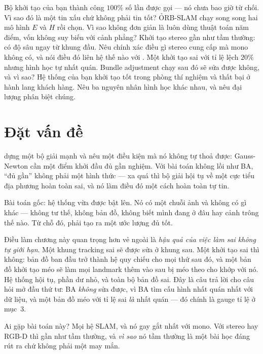 \documentclass[../../vslam.tex]{subfiles}
\begin{document}
\begin{khoigoi}
\h{Bộ khởi tạo của bạn thành công \(100\%\) số lần được gọi --- nó chưa bao giờ từ chối. Vì sao đó là một tin xấu chứ không phải tin tốt?}
\h{ORB-SLAM chạy song song hai mô hình \(E\) và \(H\) rồi chọn. Vì sao không đơn giản là luôn dùng thuật toán năm điểm, vốn không suy biến với cảnh phẳng?}
\h{Khởi tạo stereo gần như tầm thường: có độ sâu ngay từ khung đầu. Nêu chính xác điều gì stereo cung cấp mà mono không có, và nói điều đó liên hệ thế nào với .}
\h{Một khởi tạo sai với tỉ lệ lệch \(20\%\) nhưng hình học tự nhất quán. Bundle adjustment chạy sau đó sẽ sửa được không, và vì sao?}
\h{Hệ thống của bạn khởi tạo tốt trong phòng thí nghiệm và thất bại ở hành lang khách hàng. Nêu ba nguyên nhân hình học khác nhau, và nêu đại lượng phân biệt chúng.}
\end{khoigoi}

\section{Đặt vấn đề}

 dựng một bộ giải mạnh và nêu một điều kiện mà nó không tự thoả được: Gauss-Newton cần một điểm khởi đầu đủ gần nghiệm. Với bài toán không lồi như BA, ``đủ gần'' không phải một hình thức --- xa quá thì bộ giải hội tụ về một cực tiểu địa phương hoàn toàn sai, và nó làm điều đó một cách hoàn toàn tự tin.

Bài toán gốc: hệ thống vừa được bật lên. Nó có một chuỗi ảnh và không có gì khác --- không tư thế, không bản đồ, không biết mình đang ở đâu hay cảnh trông thế nào. Từ chỗ đó, phải tạo ra một ước lượng đủ tốt.

Điều làm chương này quan trọng hơn vẻ ngoài là \emph{hậu quả của việc làm sai không tự giới hạn}. Một khung tracking sai sẽ được sửa ở khung sau. Một khởi tạo sai thì không: bản đồ ban đầu trở thành hệ quy chiếu cho mọi thứ sau đó, và một bản đồ khởi tạo méo sẽ làm mọi landmark thêm vào sau bị méo theo cho khớp với nó. Hệ thống hội tụ, phần dư nhỏ, và toàn bộ bản đồ sai. Đây là câu trả lời cho câu hỏi mở đầu thứ tư: BA \emph{không} sửa được, vì BA tìm cấu hình nhất quán nhất với dữ liệu, và một bản đồ méo với tỉ lệ sai \emph{là} nhất quán --- đó chính là gauge tỉ lệ ở  mục~3.

Ai gặp bài toán này? Mọi hệ SLAM, và nó gay gắt nhất với mono. Với stereo hay RGB-D thì gần như tầm thường, và \emph{vì sao} nó tầm thường là một bài học đáng rút ra chứ không phải một may mắn.
\end{document}
